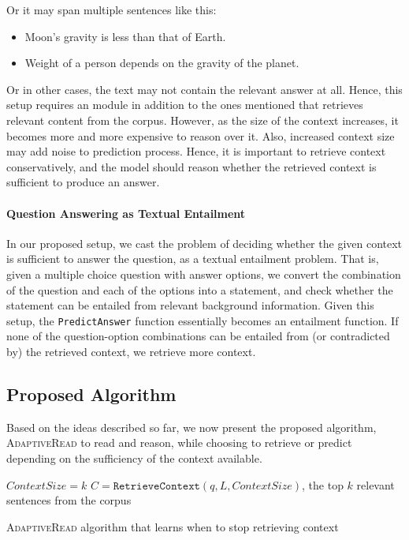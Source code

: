 Or it may span multiple sentences like this:
\begin{itemize}
 \item Moon's gravity is less than that of Earth.
 \item Weight of a person depends on the gravity of the planet.
\end{itemize}

Or in other cases, the text may not contain the relevant answer at all. Hence, this setup
requires an module in addition to the ones mentioned that retrieves relevant content from
the corpus. However, as the size of the context increases, it becomes more and more expensive to reason over
it. Also, increased context size may add noise to prediction process. Hence, it is important to
retrieve context conservatively, and the model should reason whether the retrieved context
is sufficient to produce an answer.

\paragraph{Question Answering as Textual Entailment} In our proposed setup, we
cast the problem of deciding whether the given context is sufficient to answer the question, as a
textual entailment problem. That is, given a multiple choice question with answer options, we
convert the combination of the question and each of the options into a
statement, and check whether the statement can be entailed from relevant
background information. Given this setup, the \texttt{PredictAnswer} function
essentially becomes an entailment function. If none of the question-option combinations
can be entailed from (or contradicted by) the retrieved context, we retrieve more context.

\subsection{Proposed Algorithm}
Based on the ideas described so far, we now present the proposed algorithm, \textsc{AdaptiveRead}
to read and reason, while choosing to retrieve or predict depending on the sufficiency
of the context available.

\begin{algorithm}[H]
 $ContextSize = k$ \;
 $C = \texttt{RetrieveContext}(q, L, ContextSize)$, the top $k$ relevant sentences from the corpus\;
  {
 }
 \caption{\textsc{AdaptiveRead} algorithm that learns when to stop retrieving context}
\end{algorithm}

